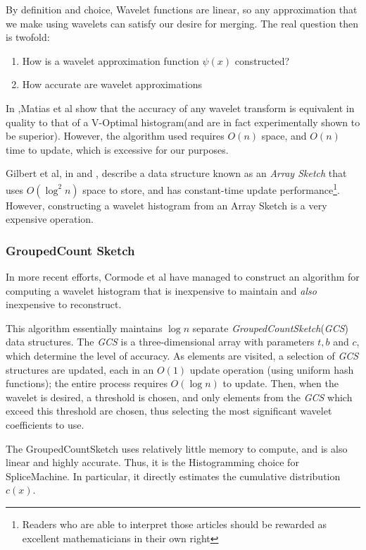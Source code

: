 By definition and choice, Wavelet functions are linear, so any approximation that we make using wavelets can satisfy our desire for merging. The real question then is twofold: 

\begin{enumerate}
				\item How is a wavelet approximation function $\psi(x)$ constructed?
				\item How accurate are wavelet approximations
\end{enumerate}

In \cite{MatiasWaveletHistogram},Matias et al show that the accuracy of any wavelet transform is equivalent in quality to that of a V-Optimal histogram(and are in fact experimentally shown to be superior). However, the algorithm used requires $O(n)$ space, and $O(n)$ time to update, which is excessive for our purposes.

Gilbert et al, in \cite{GilbertSurfing} and \cite{GilbertWaveletHistograms}, describe a data structure known as an \emph{Array Sketch} that uses $O(\log^2{n})$ space to store, and has constant-time update performance\footnote{Readers who are able to interpret those articles should be rewarded as excellent mathematicians in their own right}. However, constructing a wavelet histogram from an Array Sketch is a very expensive operation\cite{CormodeGroupedCountSketch}.

\subsubsection{GroupedCount Sketch}
\label{sec:GroupedCountSketch}
In more recent efforts, Cormode et al have managed to construct an algorithm for computing a wavelet histogram that is inexpensive to maintain and \emph{also} inexpensive to reconstruct\cite{CormodeGroupedCountSketch}.

This algorithm essentially maintains $\log{n}$ separate \emph{GroupedCountSketch}(\emph{GCS}) data structures. The \emph{GCS} is a three-dimensional array with parameters $t,b$ and $c$, which determine the level of accuracy. As elements are visited, a selection of \emph{GCS} structures are updated, each in an $O(1)$ update operation (using uniform hash functions); the entire process requires $O(\log{n})$ to update. Then, when the wavelet is desired, a threshold is chosen, and only elements from the \emph{GCS} which exceed this threshold are chosen, thus selecting the most significant wavelet coefficients to use. 

The GroupedCountSketch uses relatively little memory to compute, and is also linear and highly accurate. Thus, it is the Histogramming choice for SpliceMachine. In particular, it directly estimates the cumulative distribution $c(x)$.

